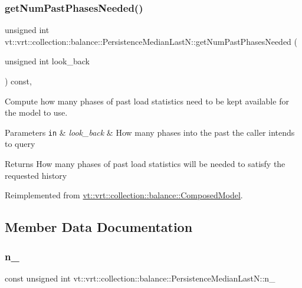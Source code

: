 \subsubsection{\texorpdfstring{get\+Num\+Past\+Phases\+Needed()}{getNumPastPhasesNeeded()}}
{\footnotesize\ttfamily unsigned int vt\+::vrt\+::collection\+::balance\+::\+Persistence\+Median\+Last\+N\+::get\+Num\+Past\+Phases\+Needed (\begin{DoxyParamCaption}\item[{unsigned int}]{look\+\_\+back }\end{DoxyParamCaption}) const\hspace{0.3cm}{\ttfamily [override]}, {\ttfamily [virtual]}}



Compute how many phases of past load statistics need to be kept available for the model to use. 


\begin{DoxyParams}[1]{Parameters}
\mbox{\tt in}  & {\em look\+\_\+back} & How many phases into the past the caller intends to query\\
\hline
\end{DoxyParams}
\begin{DoxyReturn}{Returns}
How many phases of past load statistics will be needed to satisfy the requested history 
\end{DoxyReturn}


Reimplemented from \hyperlink{classvt_1_1vrt_1_1collection_1_1balance_1_1_composed_model_a20bb994d1b3b27eb2a82729d7d5c30f3}{vt\+::vrt\+::collection\+::balance\+::\+Composed\+Model}.



\subsection{Member Data Documentation}
\mbox{\label{structvt_1_1vrt_1_1collection_1_1balance_1_1_persistence_median_last_n_aa800c86e610ba7b4ff0ddf0c91210136}} 
\subsubsection{\texorpdfstring{n\+\_\+}{n\_}}
{\footnotesize\ttfamily const unsigned int vt\+::vrt\+::collection\+::balance\+::\+Persistence\+Median\+Last\+N\+::n\+\_\+\hspace{0.3cm}{\ttfamily [private]}}



